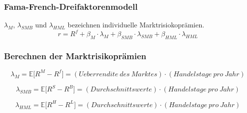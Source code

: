 \subsubsection{Fama-French-Dreifaktorenmodell}

\(\lambda_M\), \(\lambda_{SMB}\) und \(\lambda_{HML}\) bezeichnen individuelle Marktrisiokoprämien.
\begin{equation}
	r = R^f + \beta_M \cdot \lambda_M + \beta_{SMB} \cdot \lambda_{SMB} + \beta_{HML} \cdot \lambda_{HML} \label{eq:ff}
\end{equation}

\subsubsection{Berechnen der Marktrisikoprämien}
\begin{equation}
	\lambda_M = \mathbb{E} \big\lbrack R^M - R^f \big\rbrack = (Ueberrendite~des~Marktes) \cdot (Handelstage~pro~Jahr)
\end{equation}

\begin{equation}
	\lambda_{SMB} = \mathbb{E} \big\lbrack R^S - R^B \big\rbrack = (Durchschnittswerte) \cdot (Handelstage~pro~Jahr)
\end{equation}

\begin{equation}
	\lambda_{HML} = \mathbb{E} \big\lbrack R^H - R^L \big\rbrack = (Durchschnittswerte) \cdot (Handelstage~pro~Jahr)
\end{equation}
